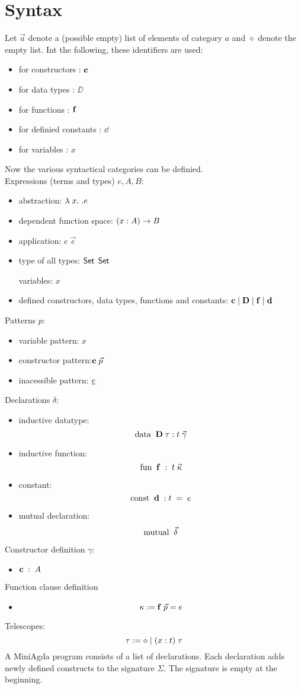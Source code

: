 \section{Syntax}
Let $\vec{a}$ denote a (possible empty) list of elements of category $a$
and $\diamond$ denote the empty list.
Int the following, these identifiers are used:
\begin{itemize}
\item for constructors : $\mathbf{c}$ 
\item for data types : $\DD$
\item for functions : $\mathbf{f}$
\item for definied constants : $\dd$
\item for variables : $x$
\end{itemize}
Now the various syntactical categories can be definied.
\\
Expressions (terms and types) $e,A,B$:  
\begin{itemize}
\item
abstraction: $ \lambda\; x .\; . e $ 
\item
dependent function space: $( x : A ) \rightarrow{B}$ 
\item 
application: $ e \; \vec{e} $ 
\item
type of all types: $ \mathsf{Set} $  $ \mathsf{Set} $ 

variables: $x$
\item
defined constructors, data types, functions and constants:
$ \mathbf{c} \;\vert\; \mathbf{D} \;\vert\; \mathbf{f} \;\vert\; \mathbf{d}$
\end{itemize}
Patterns $p$:
\begin{itemize}
\item
variable pattern: $x$ 
\item
constructor pattern:$ \mathbf{c} \; \vec{p} $ 
\item
inacessible pattern: $ \underline{e} $ 
\end{itemize}
Declarations $\delta$:
\begin{itemize}
\item
inductive datatype: 
\[\mathrm{data}\; \; \mathbf{D} \; \tau : t \; \vec{\gamma}\]  
\item
inductive function:
\[\mathrm{fun}\; \; \mathbf{f} \; : \; t \; \vec{\kappa}\]
\item
constant:
\[\mathrm{const}\; \;  \mathbf{d} \; : t \; = \; e \]
\item
mutual declaration:
\[\mathrm{mutual}\; \; \vec{\delta}\]
\end{itemize}
Constructor definition $\gamma$:
\begin{itemize}
\item
$ \mathbf{c} \; : \; A $ 
\end{itemize}
Function clause definition
\begin{itemize}
\item
\[ \kappa :=  \mathbf{f} \; \vec{p} = e \]
\end{itemize}
Telescopes:
\[ \tau := \diamond \;\vert\; ( x : t ) \; \tau \]
A MiniAgda program consists of a list of declarations.
Each declaration adds newly defined constructs to the signature $\Sigma$.
The signature is empty at the beginning.
